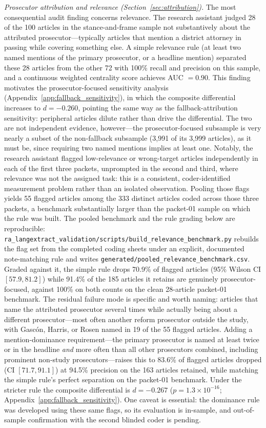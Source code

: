 \documentclass[12pt, letterpaper]{article}
\begin{document}
\emph{Prosecutor attribution and relevance (Section~\ref{sec:attribution}).} The most consequential audit finding concerns relevance. The research assistant judged 28 of the 100 articles in the stance-and-frame sample not substantively about the attributed prosecutor---typically articles that mention a district attorney in passing while covering something else. A simple relevance rule (at least two named mentions of the primary prosecutor, or a headline mention) separated these 28 articles from the other 72 with 100\% recall and precision on this sample, and a continuous weighted centrality score achieves AUC $= 0.90$. This finding motivates the prosecutor-focused sensitivity analysis (Appendix~\ref{app:fallback_sensitivity}), in which the composite differential increases to $d = -0.260$, pointing the same way as the fallback-attribution sensitivity: peripheral articles dilute rather than drive the differential. The two are not independent evidence, however---the prosecutor-focused subsample is very nearly a subset of the non-fallback subsample (3{,}991 of its 3{,}999 articles), as it must be, since requiring two named mentions implies at least one. Notably, the research assistant flagged low-relevance or wrong-target articles independently in each of the first three packets, unprompted in the second and third, where relevance was not the assigned task: this is a consistent, coder-identified measurement problem rather than an isolated observation. Pooling those flags yields 55 flagged articles among the 333 distinct articles coded across those three packets, a benchmark substantially larger than the packet-01 sample on which the rule was built. The pooled benchmark and the rule grading below are reproducible: \texttt{ra\_langextract\_validation/scripts/build\_relevance\_benchmark.py} rebuilds the flag set from the completed coding sheets under an explicit, documented note-matching rule and writes \texttt{generated/pooled\_relevance\_benchmark.csv}. Graded against it, the simple rule drops 70.9\% of flagged articles (95\% Wilson CI $[57.9, 81.2]$) while 91.4\% of the 185 articles it retains are genuinely prosecutor-focused, against 100\% on both counts on the clean 28-article packet-01 benchmark. The residual failure mode is specific and worth naming: articles that name the attributed prosecutor several times while actually being about a different prosecutor---most often another reform prosecutor outside the study, with Gasc\'{o}n, Harris, or Rosen named in 19 of the 55 flagged articles. Adding a mention-dominance requirement---the primary prosecutor is named at least twice or in the headline \emph{and} more often than all other prosecutors combined, including prominent non-study prosecutors---raises this to 83.6\% of flagged articles dropped (CI $[71.7, 91.1]$) at 94.5\% precision on the 163 articles retained, while matching the simple rule's perfect separation on the packet-01 benchmark. Under the stricter rule the composite differential is $d = -0.267$ ($p = 1.3\times 10^{-16}$; Appendix~\ref{app:fallback_sensitivity}). One caveat is essential: the dominance rule was developed using these same flags, so its evaluation is in-sample, and out-of-sample confirmation with the second blinded coder is pending.
\end{document}
